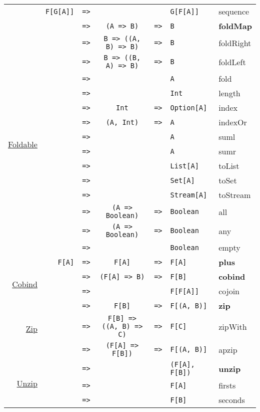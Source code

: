 \documentclass{tufte-handout}
\newcommand{\fa}{F[A]}
\newcommand{\fb}{F[B]}
\newcommand{\rarr}{\texttt{=>}}
\newcommand{\fTwo}[2]{\texttt{#1} & \rarr & & & \texttt{#2}}
\newcommand{\fThree}[3]{\texttt{#1} & \rarr & \texttt{#2} & \rarr & \texttt{#3}}
\newcommand{\sdocUrl}[1]{https://typelevel.org/cats/api/cats/#1.html}
\newcommand{\sdocHref}[1]{\href{\sdocUrl{#1}}{#1}}
\begin{document}
\begin{table}[ht]
\begin{tabular}{rrcclll}
      & \fTwo{F[G[A]]}{G[F[A]]} & sequence \\[.5cm]
    \multirow{16}{*}{\sdocHref{Foldable}}
      & \fThree{\multirow{16}{*}{\fa}}{(A => B)}{B} & \textbf{foldMap} \\
      & \fThree{}{B => ((A, B) => B)}{B} & foldRight \\
      & \fThree{}{B => ((B, A) => B)}{B} & foldLeft \\
      & \fTwo{}{A} & fold \\
      & \fTwo{}{Int} & length \\
      & \fThree{}{Int}{Option[A]} & index \\
      & \fThree{}{(A, Int)}{A} & indexOr \\
      & \fTwo{}{A} & suml \\
      & \fTwo{}{A} & sumr \\
      & \fTwo{}{List[A]} & toList \\
      & \fTwo{}{Set[A]} & toSet \\
      & \fTwo{}{Stream[A]} & toStream \\
      & \fThree{}{(A => Boolean)}{Boolean} & all \\
      & \fThree{}{(A => Boolean)}{Boolean} & any \\
      & \fTwo{}{Boolean} & empty \\[.5cm]
    \sdocHref{Plus}
      & \fThree{\fa}{\fa}{\fa} & \textbf{plus} \\[.5cm]
    \multirow{2}{*}{\sdocHref{Cobind}}
      & \fThree{\multirow{2}{*}{\fa}}{(F[A] => B)}{\fb} & \textbf{cobind} \\
      & \fTwo{}{F[\fa]} & cojoin \\[.5cm]
    \multirow{3}{*}{\sdocHref{Zip}}
      & \fThree{\multirow{3}{*}{\fa}}{\fb}{F[(A, B)]} & \textbf{zip} \\
      & \fThree{}{F[B] => ((A, B) => C)}{F[C]} & zipWith \\
      & \fThree{}{(F[A] => F[B])}{F[(A, B)]} & apzip \\[.5cm]
    \multirow{3}{*}{\sdocHref{Unzip}}
      & \fTwo{\multirow{3}{*}{F[(A, B)]}}{(\fa, \fb)} & \textbf{unzip} \\
      & \fTwo{}{\fa} & firsts \\
      & \fTwo{}{\fb} & seconds \\[.5cm]
  \end{tabular}
\end{table}




\end{document}
